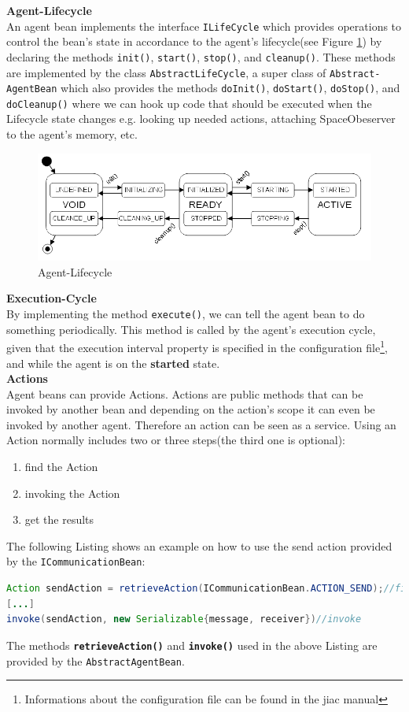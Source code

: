 \textbf{Agent-Lifecycle}\\
An agent bean implements the interface \texttt{ILifeCycle} which provides operations to control the bean's state in accordance to the agent's lifecycle(see Figure \ref{fig:lifecycle}) by declaring the methods \texttt{init()}, \texttt{start()}, \texttt{stop()}, and \texttt{cleanup()}. These methods are implemented by the class \texttt{AbstractLifeCycle}, a super class of \texttt{Abstract-AgentBean} which also provides the methods \texttt{doInit()}, \texttt{doStart()}, \texttt{doStop()}, and \texttt{doCleanup()} where we can hook up code that should be executed when the Lifecycle state changes e.g. looking up needed actions, attaching SpaceObeserver to the agent's memory, etc.
\begin{figure}
	\centering
		\includegraphics[width=1.00\textwidth]{images/lifecycle.png}
		\caption{Agent-Lifecycle \cite{JIACMAN10}}
		\label{fig:lifecycle}
\end{figure}

\textbf{Execution-Cycle}\\
By implementing the method \texttt{execute()}, we can tell the agent bean to do something periodically. This method is called by the agent's execution cycle, given that the execution interval property is specified in the configuration file\footnote{Informations about the configuration file can be found in the jiac manual\cite{JIACMAN10}}, and while the agent is on the \textbf{started} state.\\

\textbf{Actions}\\
Agent beans can provide Actions. Actions are public methods that can be invoked by another bean and depending on the action's scope it can even be invoked by another agent. Therefore an action can be seen as a service. 
Using an Action normally includes two or three steps(the third one is optional):
\begin{enumerate}
	\item find the Action
	\item invoking the Action
	\item get the results
\end{enumerate}
The following Listing shows an example on how to use the send action provided by the \texttt{ICommunicationBean}:
\begin{lstlisting}[language = Java, caption = Using an Action]
Action sendAction = retrieveAction(ICommunicationBean.ACTION_SEND);//find action
[...]
invoke(sendAction, new Serializable{message, receiver})//invoke
\end{lstlisting}
The methods \textbf{\texttt{retrieveAction()}} and \textbf{\texttt{invoke()}} used in the above Listing are provided  by the \texttt{AbstractAgentBean}.\\

